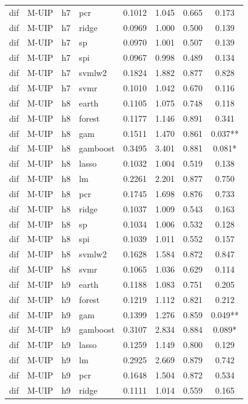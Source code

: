 \begin{ThreePartTable}
\begin{longtable}[t]{llclcccc}
dif & M-UIP & h7 & pcr & 0.1012 & 1.045 & 0.665 & 0.173\\
dif & M-UIP & h7 & ridge & 0.0969 & 1.000 & 0.500 & 0.139\\
dif & M-UIP & h7 & sp & 0.0970 & 1.001 & 0.507 & 0.139\\
dif & M-UIP & h7 & spi & 0.0967 & 0.998 & 0.489 & 0.134\\
dif & M-UIP & h7 & svmlw2 & 0.1824 & 1.882 & 0.877 & 0.828\\
dif & M-UIP & h7 & svmr & 0.1010 & 1.042 & 0.670 & 0.116\\
\addlinespace
dif & M-UIP & h8 & earth & 0.1105 & 1.075 & 0.748 & 0.118\\
dif & M-UIP & h8 & forest & 0.1177 & 1.146 & 0.891 & 0.341\\
dif & M-UIP & h8 & gam & 0.1511 & 1.470 & 0.861 & 0.037**\\
dif & M-UIP & h8 & gamboost & 0.3495 & 3.401 & 0.881 & 0.081*\\
dif & M-UIP & h8 & lasso & 0.1032 & 1.004 & 0.519 & 0.138\\
dif & M-UIP & h8 & lm & 0.2261 & 2.201 & 0.877 & 0.750\\
dif & M-UIP & h8 & pcr & 0.1745 & 1.698 & 0.876 & 0.733\\
dif & M-UIP & h8 & ridge & 0.1037 & 1.009 & 0.543 & 0.163\\
dif & M-UIP & h8 & sp & 0.1034 & 1.006 & 0.532 & 0.128\\
dif & M-UIP & h8 & spi & 0.1039 & 1.011 & 0.552 & 0.157\\
dif & M-UIP & h8 & svmlw2 & 0.1628 & 1.584 & 0.872 & 0.847\\
dif & M-UIP & h8 & svmr & 0.1065 & 1.036 & 0.629 & 0.114\\
\addlinespace
dif & M-UIP & h9 & earth & 0.1188 & 1.083 & 0.751 & 0.205\\
dif & M-UIP & h9 & forest & 0.1219 & 1.112 & 0.821 & 0.212\\
dif & M-UIP & h9 & gam & 0.1399 & 1.276 & 0.859 & 0.049**\\
dif & M-UIP & h9 & gamboost & 0.3107 & 2.834 & 0.884 & 0.089*\\
dif & M-UIP & h9 & lasso & 0.1259 & 1.149 & 0.800 & 0.129\\
dif & M-UIP & h9 & lm & 0.2925 & 2.669 & 0.879 & 0.742\\
dif & M-UIP & h9 & pcr & 0.1648 & 1.504 & 0.872 & 0.534\\
dif & M-UIP & h9 & ridge & 0.1111 & 1.014 & 0.559 & 0.165\\

\end{longtable}
\end{ThreePartTable}
